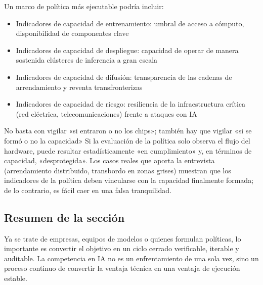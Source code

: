 Un marco de política más ejecutable podría incluir:
\begin{itemize}
    \item Indicadores de capacidad de entrenamiento: umbral de acceso a cómputo, disponibilidad de componentes clave
    \item Indicadores de capacidad de despliegue: capacidad de operar de manera sostenida clústeres de inferencia a gran escala
    \item Indicadores de capacidad de difusión: transparencia de las cadenas de arrendamiento y reventa transfronterizas
    \item Indicadores de capacidad de riesgo: resiliencia de la infraestructura crítica (red eléctrica, telecomunicaciones) frente a ataques con IA
\end{itemize}

\begin{warningbox}{No basta con vigilar «si entraron o no los chips»; también hay que vigilar «si se formó o no la capacidad»}
Si la evaluación de la política solo observa el flujo del hardware, puede resultar estadísticamente «en cumplimiento» y, en términos de capacidad, «desprotegida». Los casos reales que aporta la entrevista (arrendamiento distribuido, transbordo en zonas grises) muestran que los indicadores de la política deben vincularse con la capacidad finalmente formada; de lo contrario, es fácil caer en una falsa tranquilidad.
\end{warningbox}

\subsection{Resumen de la sección}

Ya se trate de empresas, equipos de modelos o quienes formulan políticas, lo importante es convertir el objetivo en un ciclo cerrado verificable, iterable y auditable. La competencia en IA no es un enfrentamiento de una sola vez, sino un proceso continuo de convertir la ventaja técnica en una ventaja de ejecución estable.
